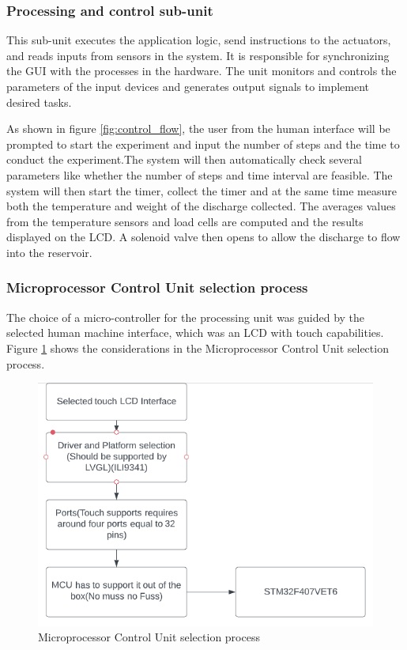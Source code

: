 \subsubsection{Processing and control sub-unit}
This sub-unit executes the application logic, send instructions to the actuators, and reads inputs from sensors in the system. It is responsible for synchronizing the GUI with the processes in the hardware. The unit monitors and controls the parameters of the input devices and generates output signals to implement desired tasks.
\par
As shown in figure \ref{fig:control_flow}, the user from the human interface will be prompted to start the experiment and input the number of steps and the time to conduct the experiment.The system will then automatically check several parameters like whether the number of steps and time interval are feasible. The system will then start the timer, collect the timer and at the same time measure both the temperature and weight of the discharge collected. The averages values from the temperature sensors and load cells are computed and the results displayed on the LCD. A solenoid valve then opens to allow the discharge to flow into the reservoir.

\subsubsection{Microprocessor Control Unit selection process}
The choice of a micro-controller for the processing unit was guided by the selected human machine interface, which was an LCD with touch capabilities. Figure \ref{fig:mcu selection} shows the considerations in the Microprocessor Control Unit selection process.
\begin{figure}
    \centering
    \includegraphics[width=0.9\linewidth]{Figures/mcu selection.png}
    \caption{Microprocessor Control Unit selection process}
    \label{fig:mcu selection}
\end{figure}

